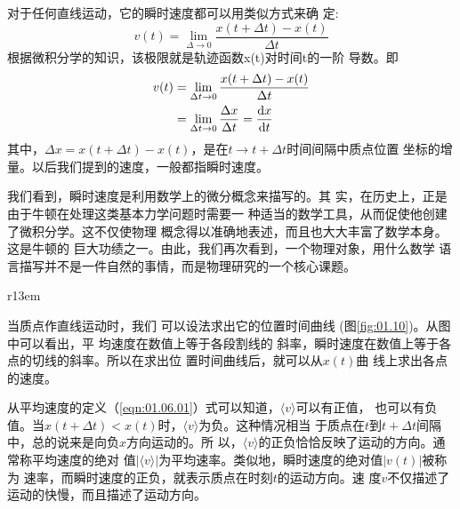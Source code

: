 对于任何直线运动，它的瞬时速度都可以用类似方式来确
定:
\begin{equation*}
        v(t)=\lim _{\Delta \rightarrow 0} \frac{x(t+\Delta t)-x(t)}{\Delta t}
\end{equation*}
根据微积分学的知识，该极限就是轨迹函数x(t)对时间t的一阶
导数。即
\begin{equation}
    \begin{aligned}
        v(t) & =\lim _{\Delta t \rightarrow 0} \frac{x(t+\Delta t)-x(t)}{\Delta t}                            \\
             & =\lim _{\Delta t \rightarrow 0} \frac{\Delta x}{\Delta t}=\frac{{\mathrm d} x}{{\mathrm d} t} \label{eqn:01.06.03}
    \end{aligned}
\end{equation}
其中，$\Delta x=x(t+\Delta t)-x(t)$，是在$t\rightarrow t+\Delta t$时间间隔中质点位置
坐标的增量。以后我们提到的速度，一般都指瞬时速度。

我们看到，瞬时速度是利用数学上的微分概念来描写的。其
实，在历史上，正是由于牛顿在处理这类基本力学问题时需要一
种适当的数学工具，从而促使他创建了微积分学。这不仅使物理
概念得以准确地表述，而且也大大丰富了数学本身。这是牛顿的
巨大功绩之一。由此，我们再次看到，一个物理对象，用什么数学
语言描写并不是一件自然的事情，而是物理研究的一个核心课题。

\begin{wrapfigure}[10]{r}{13em}
    \small \vspace{-1.2em}
    \centering
    \caption{直线运动的$x-t$图}
    \label{fig:01.10}
\end{wrapfigure}
当质点作直线运动时，我们
可以设法求出它的位置时间曲线
(图\ref{fig:01.10})。从图中可以看出，平
均速度在数值上等于各段割线的
斜率，瞬时速度在数值上等于各
点的切线的斜率。所以在求出位
置时间曲线后，就可以从$x(t)$曲
线上求出各点的速度。

从平均速度的定义（\ref{eqn:01.06.01}）式可以知道，$\langle v\rangle$可以有正值，
也可以有负值。当$x(t+\Delta t)<x(t)$时，$\langle v\rangle$为负。这种情况相当
于质点在$t$到$t+\Delta t$间隔中，总的说来是向负$x$方向运动的。所
以，$\langle v\rangle$的正负恰恰反映了运动的方向。通常称平均速度的绝对
值$|\langle v\rangle|$为平均速率。类似地，瞬时速度的绝对值$|v(t)|$被称为
速率，而瞬时速度的正负，就表示质点在时刻$t$的运动方向。速
度$v$不仅描述了运动的快慢，而且描述了运动方向。
